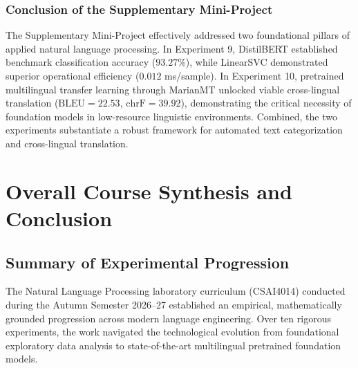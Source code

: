 \documentclass[12pt,a4paper]{report}
\begin{document}
\subsection{Conclusion of the Supplementary Mini-Project}
The Supplementary Mini-Project effectively addressed two foundational pillars of applied natural language processing. In Experiment 9, DistilBERT established benchmark classification accuracy ($\mathbf{93.27\%}$), while LinearSVC demonstrated superior operational efficiency ($0.012$ ms/sample). In Experiment 10, pretrained multilingual transfer learning through MarianMT unlocked viable cross-lingual translation ($\text{BLEU} = \mathbf{22.53}$, $\text{chrF} = \mathbf{39.92}$), demonstrating the critical necessity of foundation models in low-resource linguistic environments. Combined, the two experiments substantiate a robust framework for automated text categorization and cross-lingual translation.



\chapter{Overall Course Synthesis and Conclusion}

\section{Summary of Experimental Progression}
The Natural Language Processing laboratory curriculum (CSAI4014) conducted during the Autumn Semester 2026--27 established an empirical, mathematically grounded progression across modern language engineering. Over ten rigorous experiments, the work navigated the technological evolution from foundational exploratory data analysis to state-of-the-art multilingual pretrained foundation models.
\end{document}
